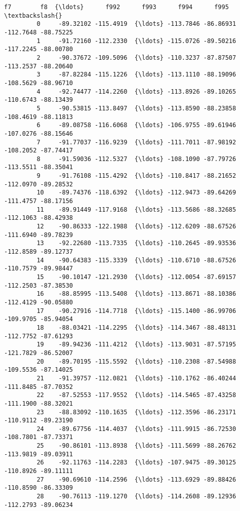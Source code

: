 \documentclass[11pt]{article}
\begin{document}
\begin{Verbatim}[commandchars=\\\{\}]
                      f7        f8  {\ldots}      f992      f993      f994      f995  \textbackslash{}
         0     -89.32102 -115.4919  {\ldots} -113.7846 -86.86931 -112.7648 -88.75225   
         1     -91.72160 -112.2330  {\ldots} -115.0726 -89.50216 -117.2245 -88.00780   
         2     -90.37672 -109.5096  {\ldots} -110.3237 -87.87507 -113.2537 -88.20640   
         3     -87.82284 -115.1226  {\ldots} -113.1110 -88.19096 -108.5629 -88.96710   
         4     -92.74477 -114.2260  {\ldots} -113.8926 -89.10265 -110.6743 -88.13439   
         5     -90.53815 -113.8497  {\ldots} -113.8590 -88.23858 -108.4619 -88.11813   
         6     -89.08758 -116.6068  {\ldots} -106.9755 -89.61946 -107.0276 -88.15646   
         7     -91.77037 -116.9239  {\ldots} -111.7011 -87.98192 -108.2052 -87.74417   
         8     -91.59036 -112.5327  {\ldots} -108.1090 -87.79726 -113.5511 -88.35041   
         9     -91.76108 -115.4292  {\ldots} -110.8417 -88.21652 -112.0970 -89.28532   
         10    -89.74376 -118.6392  {\ldots} -112.9473 -89.64269 -111.4757 -88.17156   
         11    -89.91449 -117.9168  {\ldots} -113.5686 -88.32685 -112.1063 -88.42938   
         12    -90.86333 -122.1988  {\ldots} -112.6209 -88.67526 -111.6940 -89.78239   
         13    -92.22680 -113.7335  {\ldots} -110.2645 -89.93536 -112.8589 -89.12737   
         14    -90.64383 -115.3339  {\ldots} -110.6710 -88.67526 -110.7579 -89.98447   
         15    -90.10147 -121.2930  {\ldots} -112.0054 -87.69157 -112.2503 -87.38530   
         16    -88.85995 -113.5408  {\ldots} -113.8671 -88.10386 -112.4129 -90.05880   
         17    -90.27916 -114.7718  {\ldots} -115.1400 -86.99706 -109.9705 -85.94054   
         18    -88.03421 -114.2295  {\ldots} -114.3467 -88.48131 -112.7752 -87.61293   
         19    -89.94236 -111.4212  {\ldots} -113.9031 -87.57195 -121.7829 -86.52007   
         20    -89.70195 -115.5592  {\ldots} -110.2308 -87.54988 -109.5536 -87.14025   
         21    -91.39757 -112.0821  {\ldots} -110.1762 -86.40244 -111.8485 -87.70352   
         22    -87.52553 -117.9552  {\ldots} -114.5465 -87.43258 -111.1900 -88.32021   
         23    -88.83092 -110.1635  {\ldots} -112.3596 -86.23171 -110.9112 -89.23190   
         24    -89.67756 -114.4037  {\ldots} -111.9915 -86.72530 -108.7801 -87.73371   
         25    -90.86101 -113.8938  {\ldots} -111.5699 -88.26762 -113.9819 -89.03911   
         26    -92.11763 -114.2283  {\ldots} -107.9475 -89.30125 -110.8926 -89.11111   
         27    -90.69610 -114.2596  {\ldots} -113.6929 -89.88426 -110.8590 -86.33309   
         28    -90.76113 -119.1270  {\ldots} -114.2608 -89.12936 -112.2793 -89.06234   

\end{Verbatim}
\end{document}
